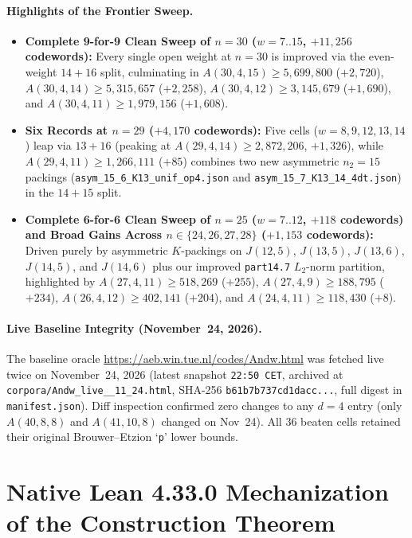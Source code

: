 \documentclass[11pt,letterpaper]{article}
\theoremstyle{plain}
\theoremstyle{definition}
\theoremstyle{remark}
\begin{document}
\paragraph{Highlights of the Frontier Sweep.}
\begin{itemize}[leftmargin=1.5em,itemsep=1.5pt]
    \item \textbf{Complete 9-for-9 Clean Sweep of $n = 30$ ($w = 7..15$, $+11{,}256$ codewords):} Every single open weight at $n = 30$ is improved via the even-weight $14{+}16$ split, culminating in $A(30, 4, 15) \ge 5{,}699{,}800$ ($+2{,}720$), $A(30, 4, 14) \ge 5{,}315{,}657$ ($+2{,}258$), $A(30, 4, 12) \ge 3{,}145{,}679$ ($+1{,}690$), and $A(30, 4, 11) \ge 1{,}979{,}156$ ($+1{,}608$).
    \item \textbf{Six Records at $n = 29$ ($+4{,}170$ codewords):} Five cells ($w = 8, 9, 12, 13, 14$) leap via $13{+}16$ (peaking at $A(29,4,14) \ge 2{,}872{,}206$, $+1{,}326$), while $A(29, 4, 11) \ge 1{,}266{,}111$ ($+85$) combines two new asymmetric $n_2 = 15$ packings (\texttt{asym\_15\_6\_K13\_unif\_op4.json} and \texttt{asym\_15\_7\_K13\_14\_4dt.json}) in the $14{+}15$ split.
    \item \textbf{Complete 6-for-6 Clean Sweep of $n = 25$ ($w = 7..12$, $+118$ codewords) and Broad Gains Across $n \in \{24, 26, 27, 28\}$ ($+1{,}153$ codewords):} Driven purely by asymmetric $K$-packings on $J(12, 5)$, $J(13, 5)$, $J(13, 6)$, $J(14, 5)$, and $J(14, 6)$ plus our improved \texttt{part14.7} $L_2$-norm partition, highlighted by $A(27,4,11) \ge 518{,}269$ ($+255$), $A(27,4,9) \ge 188{,}795$ ($+234$), $A(26,4,12) \ge 402{,}141$ ($+204$), and $A(24,4,11) \ge 118{,}430$ ($+8$).
\end{itemize}

\paragraph{Live Baseline Integrity (November~24, 2026).}
The baseline oracle \url{https://aeb.win.tue.nl/codes/Andw.html} was fetched live twice on November~24, 2026 (latest snapshot \texttt{22:50 CET}, archived at \texttt{corpora/\allowbreak Andw\_live\_\_11\_24.html}, SHA-256 \texttt{b61b7b737cd1dacc...}, full digest in \texttt{manifest.json}). Diff inspection confirmed zero changes to any $d = 4$ entry (only $A(40,8,8)$ and $A(41,10,8)$ changed on Nov~24). All $36$ beaten cells retained their original Brouwer--Etzion `\texttt{p}' lower bounds.

\section{Native Lean 4.33.0 Mechanization of the Construction Theorem}
\label{sec:lean}
\end{document}
